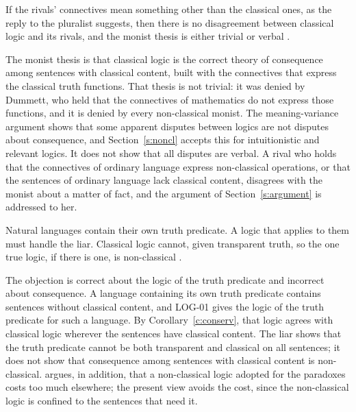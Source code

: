 \documentclass{situationist-preprint}
\begin{document}
\begin{objection}
If the rivals' connectives mean something other than the classical ones, as the reply to the pluralist suggests, then there is no disagreement between classical logic and its rivals, and the monist thesis is either trivial or verbal \citep{Quine1970}.
\end{objection}

\begin{reply}
The monist thesis is that classical logic is the correct theory of consequence among sentences with classical content, built with the connectives that express the classical truth functions. That thesis is not trivial: it was denied by Dummett, who held that the connectives of mathematics do not express those functions, and it is denied by every non-classical monist. The meaning-variance argument shows that some apparent disputes between logics are not disputes about consequence, and Section~\ref{s:noncl} accepts this for intuitionistic and relevant logics. It does not show that all disputes are verbal. A rival who holds that the connectives of ordinary language express non-classical operations, or that the sentences of ordinary language lack classical content, disagrees with the monist about a matter of fact, and the argument of Section~\ref{s:argument} is addressed to her.
\end{reply}

\begin{objection}
Natural languages contain their own truth predicate. A logic that applies to them must handle the liar. Classical logic cannot, given transparent truth, so the one true logic, if there is one, is non-classical \citep{Priest2006b,Field2008}.
\end{objection}

\begin{reply}
The objection is correct about the logic of the truth predicate and incorrect about consequence. A language containing its own truth predicate contains sentences without classical content, and LOG-01 gives the logic of the truth predicate for such a language. By Corollary~\ref{c:conserv}, that logic agrees with classical logic wherever the sentences have classical content. The liar shows that the truth predicate cannot be both transparent and classical on all sentences; it does not show that consequence among sentences with classical content is non-classical. \citet{Williamson2017} argues, in addition, that a non-classical logic adopted for the paradoxes costs too much elsewhere; the present view avoids the cost, since the non-classical logic is confined to the sentences that need it.
\end{reply}
\end{document}
